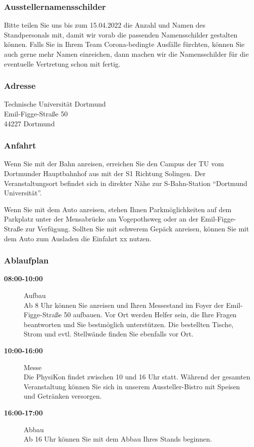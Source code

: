 \documentclass[
  paper=a4,
  fontsize=12pt,
  DIV=16,
  headheight=30pt,
  footheight=45pt,
  headinclude,
  parskip=half,
]{scrartcl}
\begin{document}
\subsubsection*{Ausstellernamensschilder}

Bitte teilen Sie uns bis zum 15.04.2022 die Anzahl und Namen des Standpersonals mit, damit wir vorab die passenden Namensschilder gestalten können.
Falls Sie in Ihrem Team Corona-bedingte Ausfälle fürchten, können Sie auch gerne mehr Namen einreichen, dann machen wir die Namensschilder für die eventuelle Vertretung schon mit fertig.

\subsubsection*{Adresse}

Technische Universität Dortmund\\
Emil-Figge-Straße 50\\
44227 Dortmund\\

\subsubsection*{Anfahrt}

Wenn Sie mit der Bahn anreisen, erreichen Sie den Campus der TU vom Dortmunder Hauptbahnhof aus mit der S1 Richtung Solingen.
Der Veranstaltungsort befindet sich in direkter Nähe zur S-Bahn-Station \enquote{Dortmund Universität}.

Wenn Sie mit dem Auto anreisen, stehen Ihnen Parkmöglichkeiten auf dem Parkplatz unter der Mensabrücke am Vogepothsweg oder an der Emil-Figge-Straße zur Verfügung.
Sollten Sie mit schwerem Gepäck anreisen, können Sie mit dem Auto zum Ausladen die Einfahrt xx nutzen.


\subsubsection*{Ablaufplan}
\begin{description}
    \item[\textbf{08:00-10:00}] Aufbau\\
      Ab 8 Uhr können Sie anreisen und Ihren Messestand im Foyer der Emil-Figge-Straße 50 aufbauen.
      Vor Ort werden Helfer sein, die Ihre Fragen beantworten und Sie bestmöglich unterstützen.
      Die bestellten Tische, Strom und evtl. Stellwände finden Sie ebenfalls vor Ort.
    \item[\textbf{10:00-16:00}] Messe\\
      Die PhysiKon findet zwischen 10 und 16 Uhr statt.
      Während der gesamten Veranstaltung können Sie sich in unserem Aussteller-Bistro mit Speisen und Getränken versorgen.
    \item[\textbf{16:00-17:00}] Abbau\\
      Ab 16 Uhr können Sie mit dem Abbau Ihres Stands beginnen.
  \end{description}
\end{document}
